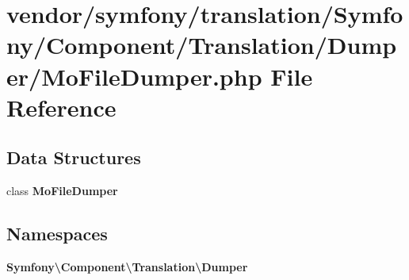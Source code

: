 \section{vendor/symfony/translation/\+Symfony/\+Component/\+Translation/\+Dumper/\+Mo\+File\+Dumper.php File Reference}
\label{_mo_file_dumper_8php}
\subsection*{Data Structures}
\begin{DoxyCompactItemize}
\item 
class {\bf Mo\+File\+Dumper}
\end{DoxyCompactItemize}
\subsection*{Namespaces}
\begin{DoxyCompactItemize}
\item 
 {\bf Symfony\textbackslash{}\+Component\textbackslash{}\+Translation\textbackslash{}\+Dumper}
\end{DoxyCompactItemize}
